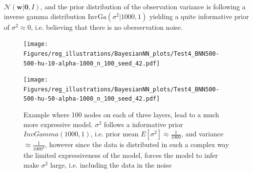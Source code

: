 
$\mathcal{N}(\textbf{w}|\bm{0},I)$, and the prior distribution of the observation
variance is following a inverse gamma distribution $\text{InvGa}(\sigma^2|1000,1)$ yielding a quite 
informative prior of $\sigma^2 \approx 0$, i.e. believing that there is no oberservation noise.

\begin{figure}[h]
    \centering
    \begin{minipage}[b]{0.49\textwidth}
     \texttt{[image: Figures/reg\_illustrations/BayesianNN\_plots/Test4\_BNN500-500-hu-10-alpha-1000\_n\_100\_seed\_42.pdf]}
    \end{minipage}
    \hfill
    \begin{minipage}[b]{0.49\textwidth}
      \texttt{[image: Figures/reg\_illustrations/BayesianNN\_plots/Test4\_BNN500-500-hu-50-alpha-1000\_n\_100\_seed\_42.pdf]}
     \end{minipage}
     \caption{Example where 100 nodes on each of three layers, lead to a much more expressive model.
     $\sigma^2$ follows a informative prior $InvGamma(1000,1)$, i.e. prior mean $E[\sigma^2] \approx
     \frac{1}{1000}$, and variance $\approx \frac{1}{1000^3}$, however since the data is distributed in such 
     a complex way the limited expressiveness of the model, forces the model to infer make $\sigma^2$ large, 
     i.e. including the data in the noise}
\end{figure}




